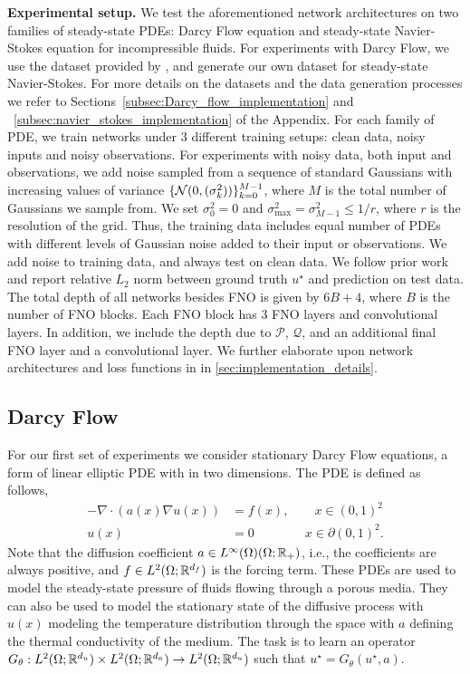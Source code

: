 \textbf{Experimental setup.} We test the aforementioned network architectures on two families of steady-state PDEs: Darcy Flow equation and steady-state Navier-Stokes equation for incompressible fluids. 
For experiments with Darcy Flow, we use the dataset provided by \cite{li2020fourier}, 
and generate our own dataset for steady-state Navier-Stokes.
For more details on the datasets and the data generation processes we refer to 
Sections~\ref{subsec:Darcy_flow_implementation} 
and ~\ref{subsec:navier_stokes_implementation} of the Appendix.
For each family of PDE, we train networks under 3 different training setups: clean data, noisy inputs and noisy observations. For experiments with noisy data, both input and observations, we add noise sampled from a sequence of standard Gaussians with increasing values of variance $\{ {\mathcal{N}}(0, (\sigma_k^2))\}_{k=0}^{M-1}$, 
where $M$ is the total number of Gaussians we sample from. 
We set $\sigma^2_0 = 0$ and $\sigma^2_{\text{max}} = \sigma^2_{M-1} \leq 1/r$, where $r$ is the resolution of the grid. Thus, the training data includes equal number of PDEs with different levels of Gaussian noise added to their input or observations.
We add noise to training data, and always test on clean data. We follow prior work \citep{li2020neural} and report relative $L_2$ norm between ground truth $u^\star$ 
and prediction on test data.
The total depth of all networks besides FNO is given by $6B + 4$, where $B$ is the number of FNO blocks. Each FNO block has 3 FNO layers and convolutional layers. 
In addition, we include the depth due to $\mathcal{P}$, $\mathcal{Q}$, and an additional final FNO layer and a convolutional layer. 
We further elaborate upon network architectures and loss functions in 
in \cref{sec:implementation_details}. 



\vspace{-2mm}
\subsection{Darcy Flow}
\label{subsec:darcy_flow}
For our first set of experiments we consider stationary Darcy Flow equations, a form of linear elliptic PDE with 
in two dimensions. 
The PDE is defined as follows,
\begin{equation}
    \begin{split}
        -\nabla \cdot (a(x)\nabla u(x)) &= f(x), \qquad x \in (0, 1)^2 \\
        u(x) &= 0 \qquad\qquad x \in \partial(0, 1)^2.
    \end{split}
\end{equation}
Note that the diffusion coefficient
$a \in L^\infty(\Omega)(\Omega; \mathbb{R}_+)$, 
i.e., the coefficients are always positive, 
and 
$f\in
L^2(\Omega; \mathbb{R}^{d_f})$
is the forcing term.
These PDEs are used to model the 
steady-state pressure of fluids flowing through a porous media. 
They can also be used to model the stationary state of the diffusive process with $u(x)$ modeling 
the temperature distribution through the space with $a$ defining the thermal conductivity of the medium.
The task is to learn an operator 
$G_\theta: L^2(\Omega; \mathbb{R}^{d_u}) \times L^2(\Omega; \mathbb{R}^{d_a}) \to L^2(\Omega; \mathbb{R}^{d_u})$
such that $u^\star = G_\theta(u^\star, a)$.


